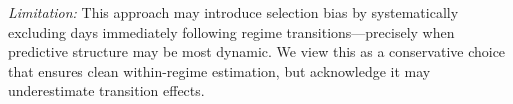 \documentclass[sigconf,anonymous]{acmart}
\begin{document}
\emph{Limitation:} This approach may introduce selection bias by systematically
excluding days immediately following regime transitions---precisely when predictive
structure may be most dynamic. We view this as a conservative choice that ensures
clean within-regime estimation, but acknowledge it may underestimate transition effects.


\end{document}
